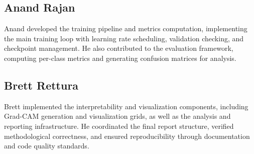 \documentclass[conference]{IEEEtran}
\begin{document}
\subsection*{Anand Rajan}
Anand developed the training pipeline and metrics computation, implementing
the main training loop with learning rate scheduling, validation checking, and
checkpoint management. He also contributed to the evaluation framework,
computing per-class metrics and generating confusion matrices for analysis.

\subsection*{Brett Rettura}
Brett implemented the interpretability and visualization components, including
Grad-CAM generation and visualization grids, as well as the analysis and
reporting infrastructure. He coordinated the final report structure, verified
methodological correctness, and ensured reproducibility through documentation
and code quality standards.
\end{document}
